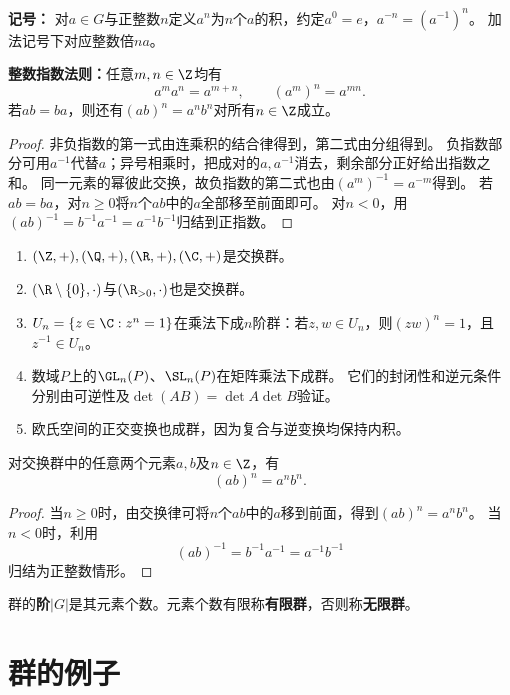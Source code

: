 \textbf{记号：}
\label{p2:concept:c1-l105}对$a\in G$与正整数$n$定义$a^n$为$n$个$a$的积，约定$a^0=e$，$a^{-n}=(a^{-1})^n$。
\label{p2:concept:c1-l106}加法记号下对应整数倍$na$。


\begin{proposition}
\textbf{整数指数法则：}任意$m,n\in\Z$均有
\[
a^ma^n=a^{m+n},\qquad(a^m)^n=a^{mn}.
\]
若$ab=ba$，则还有$(ab)^n=a^nb^n$对所有$n\in\Z$成立。
\end{proposition}
\begin{proof}
非负指数的第一式由连乘积的结合律得到，第二式由分组得到。
负指数部分可用$a^{-1}$代替$a$；异号相乘时，把成对的$a,a^{-1}$消去，剩余部分正好给出指数之和。
同一元素的幂彼此交换，故负指数的第二式也由$(a^m)^{-1}=a^{-m}$得到。
若$ab=ba$，对$n\geq0$将$n$个$ab$中的$a$全部移至前面即可。
对$n<0$，用$(ab)^{-1}=b^{-1}a^{-1}=a^{-1}b^{-1}$归结到正指数。
\end{proof}

\begin{example}
\begin{enumerate}
	\item $(\Z,+),(\Q,+),(\R,+),(\C,+)$是交换群。
	\item $(\R\setminus\{0\},\cdot)$与$(\R_{>0},\cdot)$也是交换群。
	\item $U_n=\{z\in\C:z^n=1\}$在乘法下成$n$阶群：若$z,w\in U_n$，则$(zw)^n=1$，且$z^{-1}\in U_n$。
	\item 数域$P$上的$\GL_n(P)$、$\SL_n(P)$在矩阵乘法下成群。
	它们的封闭性和逆元条件分别由可逆性及$\det(AB)=\det A\det B$验证。
	\item 欧氏空间的正交变换也成群，因为复合与逆变换均保持内积。
\end{enumerate}
\end{example}
\begin{proposition}
	对交换群中的任意两个元素$a,b$及$n\in\Z$，有
	\[
	(ab)^n=a^n b^n.
	\]
\end{proposition}
\begin{proof}
	当$n\geq0$时，由交换律可将$n$个$ab$中的$a$移到前面，得到$(ab)^n=a^nb^n$。
	当$n<0$时，利用
	\[
	(ab)^{-1}=b^{-1}a^{-1}=a^{-1}b^{-1}
	\]
	归结为正整数情形。
\end{proof}
\begin{definition}
\label{p2:concept:c1-l149}群的\textbf{阶}$|G|$是其元素个数。元素个数有限称\textbf{有限群}，否则称\textbf{无限群}。

\end{definition}

\section{群的例子}
